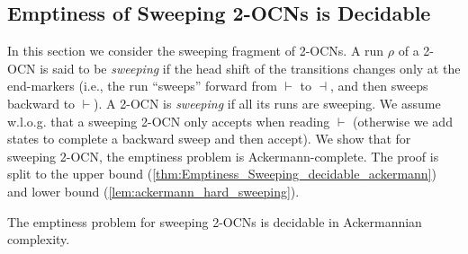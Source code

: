 \documentclass[USenglish]{lipics-v2021}
\newcommand{\shtodo}[1]{\todo[color=cyan!25,size=\small]{SH: #1}}
\newcommand{\lmark}{\vdash}
\newcommand{\rmark}{\dashv}
\begin{document}
\subsection{Emptiness of Sweeping 2-OCNs is Decidable}
\label{sec:sweeping} In this section we consider the sweeping fragment of
2-OCNs. A run $\rho$ of a 2-OCN is said to be \emph{sweeping} if the head shift
of the transitions changes only at the end-markers (i.e., the run ``sweeps''
forward from $\lmark$ to $\rmark$, and then sweeps backward to $\lmark$). A
2-OCN is \emph{sweeping} if all its runs are sweeping.  We assume w.l.o.g. that
a sweeping 2-OCN only accepts when reading $\lmark$ (otherwise we add states to
complete a backward sweep and then accept).
We show that for sweeping 2-OCN, the emptiness problem is Ackermann-complete. The proof is split to the upper bound (\cref{thm:Emptiness_Sweeping_decidable_ackermann}) and lower bound (\cref{lem:ackermann_hard_sweeping}).
\begin{theorem}
	\label{thm:Emptiness_Sweeping_decidable_ackermann} The emptiness problem for
	sweeping 2-OCNs is decidable in Ackermannian complexity.
\end{theorem} 
\end{document}
